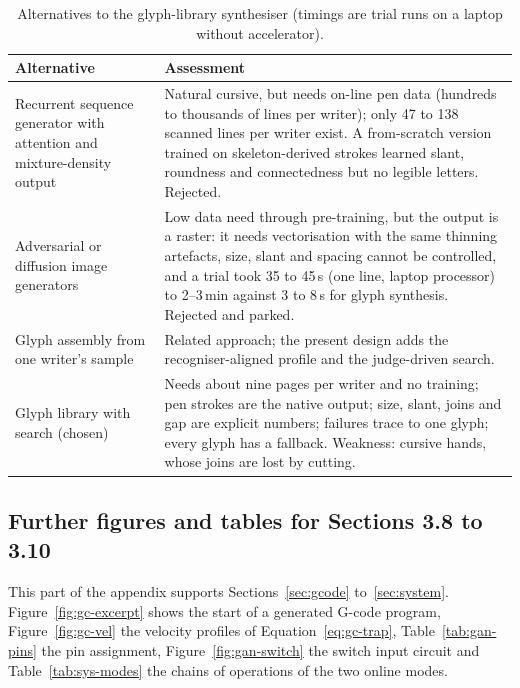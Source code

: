 \begin{table}[!htbp]
\centering
\fontsize{9.5}{11.5}\selectfont
\begin{tabularx}{\linewidth}{|p{3.2cm}|X|}
\hline
\textbf{Alternative} & \textbf{Assessment} \\
\hline
Recurrent sequence generator with attention and mixture-density output \cite{graves2013} & Natural cursive, but needs on-line pen data (hundreds to thousands of lines per writer); only 47 to 138 scanned lines per writer exist. A from-scratch version trained on skeleton-derived strokes learned slant, roundness and connectedness but no legible letters. Rejected. \\
\hline
Adversarial or diffusion image generators \cite{kang2020,dai2024} & Low data need through pre-training, but the output is a raster: it needs vectorisation with the same thinning artefacts, size, slant and spacing cannot be controlled, and a trial took 35 to 45\,s (one line, laptop processor) to 2--3\,min against 3 to 8\,s for glyph synthesis. Rejected and parked. \\
\hline
Glyph assembly from one writer's sample \cite{haines2016} & Related approach; the present design adds the recogniser-aligned profile and the judge-driven search. \\
\hline
Glyph library with search (chosen) & Needs about nine pages per writer and no training; pen strokes are the native output; size, slant, joins and gap are explicit numbers; failures trace to one glyph; every glyph has a fallback. Weakness: cursive hands, whose joins are lost by cutting. \\
\hline
\end{tabularx}
\caption{Alternatives to the glyph-library synthesiser (timings are trial runs on a laptop without accelerator).}
\label{tab:syn-alt}
\end{table}

\subsection{Further figures and tables for Sections 3.8 to 3.10}

This part of the appendix supports Sections~\ref{sec:gcode} to~\ref{sec:system}.
Figure~\ref{fig:gc-excerpt} shows the start of a generated G-code program, Figure~\ref{fig:gc-vel} the velocity profiles of Equation~\ref{eq:gc-trap}, Table~\ref{tab:gan-pins} the pin assignment, Figure~\ref{fig:gan-switch} the switch input circuit and Table~\ref{tab:sys-modes} the chains of operations of the two online modes.

